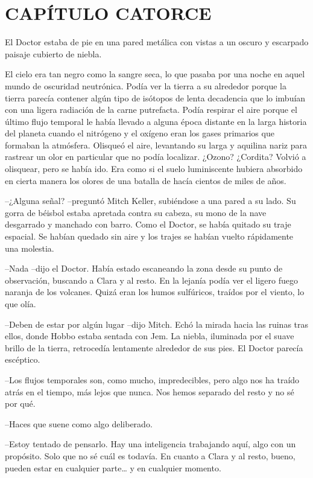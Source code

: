 \chapter*{CAPÍTULO CATORCE}

{El Doctor estaba de pie en una pared metálica con vistas a un oscuro y
escarpado paisaje cubierto de niebla.}

{El cielo era tan negro como la sangre seca, lo que pasaba por una noche
 en aquel mundo de oscuridad neutrónica. Podía ver la tierra a su
 alrededor porque la tierra parecía contener algún tipo de isótopos de
 lenta decadencia que lo imbuían con una ligera radiación de la carne
 putrefacta. Podía respirar el aire porque el último flujo temporal le
 había llevado a alguna época distante en la larga historia del planeta
 cuando el nitrógeno y el oxígeno eran los gases primarios que formaban
 la atmósfera. Olisqueó el aire, levantando su larga y aquilina nariz
 para rastrear un olor en particular que no podía localizar. ¿Ozono?
 ¿Cordita? Volvió a olisquear, pero se había ido. Era como si el suelo
 luminiscente hubiera absorbido en cierta manera los olores de una
batalla de hacía cientos de miles de años.}

{--¿Alguna señal? --preguntó Mitch Keller, subiéndose a una pared a su
 lado. Su gorra de béisbol estaba apretada contra su cabeza, su mono de
 la nave desgarrado y manchado con barro. Como el Doctor, se había
 quitado su traje espacial. Se habían quedado sin aire y los trajes se
habían vuelto rápidamente una molestia.}

{--Nada --dijo el Doctor. Había estado escaneando la zona desde su punto
 de observación, buscando a Clara y al resto. En la lejanía podía ver el
 ligero fuego naranja de los volcanes. Quizá eran los humos sulfúricos,
traídos por el viento, lo que olía.}

{--Deben de estar por algún lugar --dijo Mitch. Echó la mirada hacia las
 ruinas tras ellos, donde Hobbo estaba sentada con Jem. La niebla,
 iluminada por el suave brillo de la tierra, retrocedía lentamente
alrededor de sus pies. El Doctor parecía escéptico.}

{--Los flujos temporales son, como mucho, impredecibles, pero algo nos ha
 traído atrás en el tiempo, más lejos que nunca. Nos hemos separado del
resto y no sé por qué.}

{--Haces que suene como algo deliberado.}

{--Estoy tentado de pensarlo. Hay una inteligencia trabajando aquí, algo
 con un propósito. Solo que no sé cuál es todavía. En cuanto a Clara y al
 resto, bueno, pueden estar en cualquier parte\ldots{} y en cualquier
momento.}

